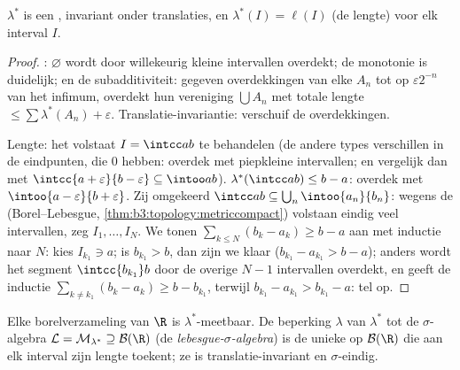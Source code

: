 \begin{lemma}\label{lem:b3:measure:outerbasics}
$\lambda^*$ is een , invariant onder translaties, en
$\lambda^*(I) = \ell(I)$ (de lengte) voor elk interval $I$.
\end{lemma}

\begin{proof}
: $\varnothing$ wordt door willekeurig kleine
intervallen overdekt; de monotonie is duidelijk; en de
subadditiviteit: gegeven overdekkingen van elke $A_n$ tot op
$\varepsilon 2^{-n}$ van het infimum, overdekt hun vereniging
$\bigcup A_n$ met totale lengte $\leq \sum \lambda^*(A_n) +
\varepsilon$. Translatie-invariantie: verschuif de
overdekkingen.

Lengte: het volstaat $I = \intcc ab$ te behandelen (de andere
types verschillen in de eindpunten, die  $0$ hebben:
overdek met piepkleine intervallen; en vergelijk dan met
$\intcc{a+\varepsilon}{b - \varepsilon} \subseteq \intoo ab$).
$\lambda^*(\intcc ab) \leq b - a$: overdek met
$\intoo{a-\varepsilon}{b+\varepsilon}$. Zij omgekeerd $\intcc ab
\subseteq \bigcup_n\intoo{a_n}{b_n}$: wegens de
\emph{} (Borel--Lebesgue,
\cref{thm:b3:topology:metriccompact}) volstaan eindig veel
intervallen, zeg $I_1, \dots, I_N$. We tonen $\sum_{k\leq N}(b_k -
a_k) \geq b - a$ aan met inductie naar $N$: kies $I_{k_1} \ni a$;
is $b_{k_1} > b$, dan zijn we klaar ($b_{k_1} - a_{k_1} > b - a$);
anders wordt het segment $\intcc{b_{k_1}}b$ door de overige $N -
1$ intervallen overdekt, en geeft de inductie $\sum_{k \neq
k_1}(b_k - a_k) \geq b - b_{k_1}$, terwijl $b_{k_1} - a_{k_1} >
b_{k_1} - a$: tel op.
\end{proof}

\begin{theorem}[Lebesguemaat]\label{thm:b3:measure:lebesgue}
Elke borelverzameling van $\R$ is $\lambda^*$-meetbaar. De
beperking $\lambda$ van $\lambda^*$ tot de $\sigma$-algebra
$\mathcal L = \mathcal M_{\lambda^*} \supseteq \mathcal B(\R)$ (de
\emph{lebesgue-$\sigma$-algebra}) is de unieke  op $\mathcal
B(\R)$ die aan elk interval zijn lengte toekent; ze is
translatie-invariant en $\sigma$-eindig.
\end{theorem}

